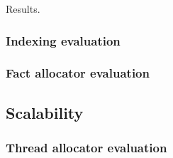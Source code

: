 \begin{table}[ht]
   \begin{center}
      
   \end{center}
   \caption{Results.}
   \label{table:implementation:cmem}
\end{table}

\subsubsection{Indexing evaluation}

\subsubsection{Fact allocator evaluation}

\subsection{Scalability}

\subsubsection{Thread allocator evaluation}

